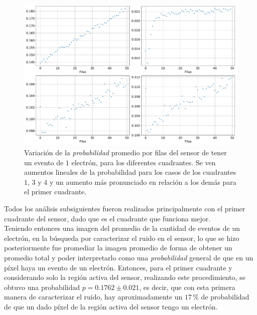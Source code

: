 \begin{figure}[h]
    \centering
    \includegraphics[scale=0.45]{Figs/Gradiente_en_filas_sensor.pdf}
    \caption{\footnotesize{Variación de la \textit{probabilidad} promedio por filas del sensor de tener un evento de $1$ electrón, para los diferentes cuadrantes. Se ven aumentos lineales de la probabilidad para los casos de los cuadrantes $1$, $3$ y $4$ y un aumento más pronunciado en relación a los demás para el primer cuadrante.}}
    \label{fig:GradienteProb}
\end{figure}
\indent Todos los análisis subsiguientes fueron realizados principalmente con el primer cuadrante del sensor, dado que es el cuadrante que funciona mejor.\\
\indent Teniendo entonces una imagen del promedio de la cantidad de eventos de un electrón, en la búsqueda por caracterizar el ruido en el sensor, lo que se hizo posteriormente fue promediar la imagen promedio de forma de obtener un promedio total y poder interpretarlo como una \textit{probabilidad} general de que en un píxel haya un evento de un electrón. Entonces, para el primer cuadrante y considerando solo la región activa del sensor, realizando este procedimiento, se obtuvo una probabilidad $p = 0.1762 \pm 0.021$, es decir, que con esta primera manera de caracterizar el ruido, hay aproximadamente un $17\,\%$ de probabilidad de que un dado píxel de la región activa del sensor tengo un electrón.\\
